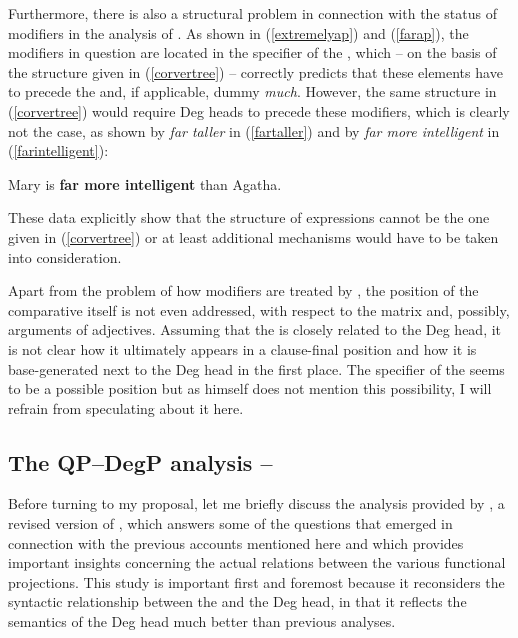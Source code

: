 Furthermore, there is also a structural problem in connection with the status of modifiers in the analysis of \citet{corver1997}. As shown in (\ref{extremelyap}) and (\ref{farap}), the modifiers in question are located in the specifier of the , which -- on the basis of the structure given in (\ref{corvertree}) -- correctly predicts that these elements have to precede the  and, if applicable, dummy \textit{much}. However, the same structure in (\ref{corvertree}) would require Deg heads to precede these modifiers, which is clearly not the case, as shown by \textit{far taller} in (\ref{fartaller}) and by \textit{far more intelligent} in (\ref{farintelligent}):

\ea Mary is \textbf{far more intelligent} than Agatha. \label{farintelligent}
\z

These data explicitly show that the structure of  expressions cannot be the one given in (\ref{corvertree}) or at least additional mechanisms would have to be taken into consideration.

Apart from the problem of how modifiers are treated by \citet{corver1997}, the position of the comparative  itself is not even addressed, with respect to the matrix   and, possibly, arguments of adjectives. Assuming that the  is closely related to the Deg head, it is not clear how it ultimately appears in a clause-final position and how it is base-generated next to the Deg head in the first place. The specifier of the  seems to be a possible position but as \citet{corver1997} himself does not mention this possibility, I will refrain from speculating about it here.

\subsection{The QP--DegP analysis -- \citet{lechner1999diss, lechner2004}} \label{sec:2qpdegp}
Before turning to my proposal, let me briefly discuss the analysis provided by \citet{lechner2004}, a revised version of \citet{lechner1999diss}, which answers some of the questions that emerged in connection with the previous accounts mentioned here and which provides important insights concerning the actual relations between the various functional projections. This study is important first and foremost because it reconsiders the syntactic relationship between the  and the Deg head, in that it reflects the semantics of the Deg head much better than previous analyses.

